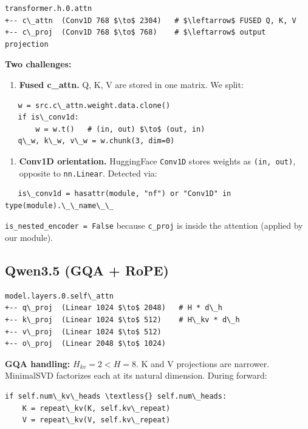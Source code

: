 \begin{lstlisting}
transformer.h.0.attn
+-- c\_attn  (Conv1D 768 $\to$ 2304)   # $\leftarrow$ FUSED Q, K, V
+-- c\_proj  (Conv1D 768 $\to$ 768)    # $\leftarrow$ output projection
\end{lstlisting}

\textbf{Two challenges:}

\begin{enumerate}
\item \textbf{Fused c\_attn.} Q, K, V are stored in one matrix. We split:
\end{enumerate}
\begin{lstlisting}
   w = src.c\_attn.weight.data.clone()
   if is\_conv1d:
       w = w.t()   # (in, out) $\to$ (out, in)
   q\_w, k\_w, v\_w = w.chunk(3, dim=0)
\end{lstlisting}

\begin{enumerate}
\item \textbf{Conv1D orientation.} HuggingFace \texttt{Conv1D} stores weights as \texttt{(in, out)},
  opposite to \texttt{nn.Linear}. Detected via:
\end{enumerate}
\begin{lstlisting}
   is\_conv1d = hasattr(module, "nf") or "Conv1D" in type(module).\_\_name\_\_
\end{lstlisting}

\texttt{is\_nested\_encoder = False} because \texttt{c\_proj} is inside the attention (applied 
by our module).

\subsection{Qwen3.5 (GQA + RoPE)}

\begin{lstlisting}
model.layers.0.self\_attn
+-- q\_proj  (Linear 1024 $\to$ 2048)   # H * d\_h
+-- k\_proj  (Linear 1024 $\to$ 512)    # H\_kv * d\_h
+-- v\_proj  (Linear 1024 $\to$ 512)
+-- o\_proj  (Linear 2048 $\to$ 1024)
\end{lstlisting}

\textbf{GQA handling:} $H_{kv} = 2 < H = 8$. K and V projections are narrower. 
MinimalSVD factorizes each at its natural dimension. During forward:

\begin{lstlisting}
if self.num\_kv\_heads \textless{} self.num\_heads:
    K = repeat\_kv(K, self.kv\_repeat)
    V = repeat\_kv(V, self.kv\_repeat)
\end{lstlisting}

